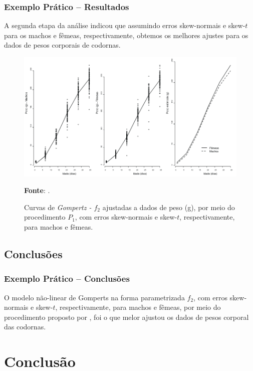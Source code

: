 \documentclass[13pt, aspectratio=169]{beamer}
\begin{document}
\begin{frame}
    \frametitle{Exemplo Prático -- Resultados}
    \small
    A segunda etapa da análise indicou que assumindo erros skew-normais e skew-$t$ para os machos e fêmeas, respectivamente, obtemos os melhores ajustes para os dados de pesos corporais de codornas.

    \begin{figure}[!ht]
        \centering
        \includegraphics[width=0.53\linewidth]{images/peso_codornas.png}
        \scriptsize
        \caption{\scriptsize Curvas de \textit{Gompertz - $f_2$} ajustadas a dados de peso (g), por meio do procedimento $P_1$, com erros skew-normais e skew-$t$, respectivamente, para machos e fêmeas.}
        \label{fig:peso_codornas}
        \vspace{-0.3cm}
        \begin{minipage}{\linewidth}
            \textbf{Fonte}: \textcite{rossi2014modelagem}.
        \end{minipage}
    \end{figure}

\end{frame}

\subsection{Conclusões}

\begin{frame}
    \frametitle{Exemplo Prático -- Conclusões}

    O modelo não-linear de Gomperts na forma parametrizada $f_2$, com erros skew-normais e skew-$t$, respectivamente, para machos e fêmeas, por meio do procedimento proposto por \textcite{de2009bayesian}, foi o que melor ajustou os dados de pesos corporal das codornas. 
    

\end{frame}

\section{Conclusão}
\end{document}

